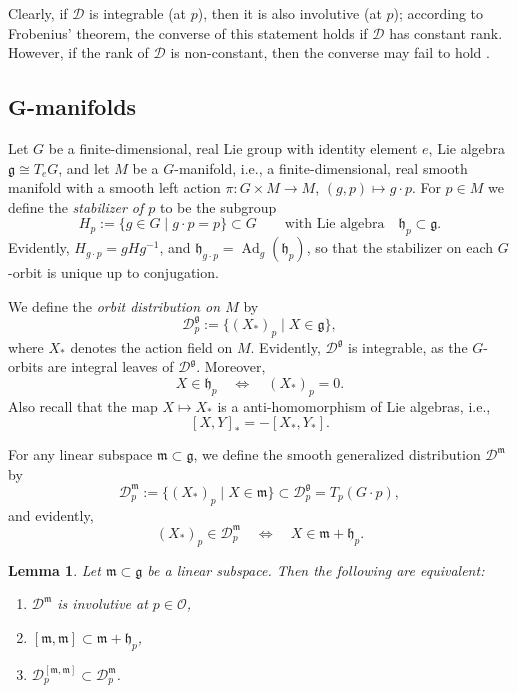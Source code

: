 \documentclass[pdftex]{sigma}
\numberwithin{equation}{section}
\newtheorem{Lemma}[Theorem]{Lemma}
\newcommand{\be}{\begin{equation}}
\newcommand{\ee}{\end{equation}}
\newcommand{\ocal}{\mathcal{O}}
\newcommand{\dcal}{\mathcal{D}}
\newcommand{\m}{\mathfrak{m}}
\newcommand{\g}{{\mathfrak{g}}}
\newcommand{\h}{{\mathfrak h}}
\renewcommand{\m}{{\mathfrak m}}
\begin{document}
Clearly, if $\dcal$ is integrable (at $p$), then it is also involutive (at $p$); according to Frobenius' theorem, the converse of this statement holds if $\dcal$ has constant rank. However, if the rank of $\dcal$ is non-constant, then the converse may fail to hold \cite{Sussmann-1973}.

\subsection[G-manifolds]{$\boldsymbol{G}$-manifolds}\label{subsec: G-manifolds}

Let $G$ be a finite-dimensional, real Lie group with identity element $e$, Lie algebra $\g\cong T_{e}G$, and let $M$ be a $G$-manifold, i.e., a finite-dimensional, real smooth manifold with a smooth left action $\pi\colon G \times M \to M$, $(g, p) \mapsto g \cdot p$. For $p \in M$ we define the {\em stabilizer of $p$} to be the subgroup
\[
H_p := \{ g \in G \mid g \cdot p = p\} \subset G \qquad \text{with Lie algebra} \quad \h_p \subset \g.
\]
Evidently, $H_{g \cdot p} = gHg^{-1}$, and $\h_{g \cdot p} = \operatorname{Ad}_g(\h_p)$, so that the stabilizer on each $G$-orbit is unique up to conjugation.

We define the {\em orbit distribution on $M$} by
\[%
\dcal^\g_p := \{(X_\ast)_p \mid X \in \g\},
\]
where $X_\ast$ denotes the action field on $M$. Evidently, $\dcal^\g$ is integrable, as the $G$-orbits are integral leaves of $\dcal^\g$.
Moreover,
\[ %
X \in \h_p \quad \Leftrightarrow \quad (X_\ast)_p = 0.
\]
Also recall that the map $X \mapsto X_\ast$ is a anti-homomorphism of Lie algebras, i.e.,
\be \label{eq:action-comm}
{}[X, Y]_\ast = - [X_\ast, Y_\ast].
\ee

For any linear subspace $\m \subset \g$, we define the smooth generalized distribution $\dcal^\m$ by
\be \label{eq:Dm}
\dcal^\m_p := \{(X_\ast)_p \mid X \in \m\} \subset \dcal^\g_p = T_p(G \cdot p),
\ee
and evidently,
\be \label{eq:Dm-criterion}
(X_\ast)_p \in \dcal^\m_p \quad \Leftrightarrow \quad X \in \m + \h_p.
\ee

\begin{Lemma} \label{lem:involutive}
Let $\m \subset \g$ be a linear subspace. Then the following are equivalent:
\begin{enumerate}\itemsep=0pt
\item[$(1)$] $\dcal^\m$ is involutive at $p \in \ocal$,
\item[$(2)$] $[\m, \m] \subset \m + \h_p$,
\item[$(3)$] $\dcal^{[\m, \m]}_p \subset \dcal^\m_p$.
\end{enumerate}
\end{Lemma}
\end{document}
